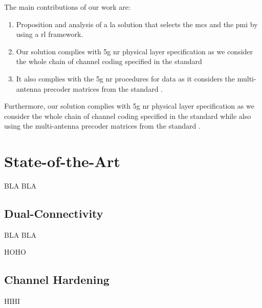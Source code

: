 %
%
%

The main contributions of our work are:
\begin{enumerate}
    \item Proposition and analysis of a \gls{la} solution that selects the \gls{mcs} and the \gls{pmi} by using a \gls{rl} framework.
    \item Our solution complies with \gls{5g} \gls{nr} physical layer specification as we consider the whole chain of channel coding specified in the standard \cite{3gpp.38.212}
    \item It also complies with the \gls{5g} \gls{nr} procedures for data as it considers the multi-antenna precoder matrices from the standard \cite{3gpp.38.214}.
\end{enumerate}
%
Furthermore, our solution complies with \gls{5g} \gls{nr} physical layer specification as we consider the whole chain of channel coding specified in the standard \cite{3gpp.38.212} while also using the multi-antenna precoder matrices from the standard \cite{3gpp.38.214}.


\section{State-of-the-Art}
BLA BLA
\subsection{Dual-Connectivity}\label{sec:chp_intr_multi_connect}
BLA BLA

HOHO
\subsection{Channel Hardening}\label{sec:chp_intr_channel_hardening}
HIHI

